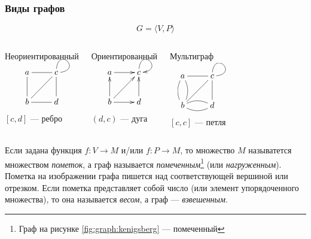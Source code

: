 \begin{frame}
    \frametitle{Виды графов}
    \[
        G=\langle V,P\rangle
    \]
    \begin{columns}
            \begin{block}{Неориентированный}
                \[
                    {\xymatrix{
                        a \ar@{-}[r] \ar@{-}[d]
                            &c \ar@{-}[d] \ar@{-}@(u,r)[]
                                \\
                        b \ar@{-}[ur] \ar@{-}[r]
                            &d
                    }}
                \]
                $[c,d]$ --- \alert{ребро}
            \end{block}
        
            \begin{block}{Ориентированный}
                \[
                    {\xymatrix{
                        a \ar@{->}[r]
                            &c \ar@{->}@(u,r)[]
                                \\
                        b  \ar@{->}[u] \ar@{->}[ur] \ar@{->}[r]
                            &d \ar@{->}[u]
                    }}
                \]
                $(d,c)$ --- \alert{дуга}
            \end{block}
            \begin{block}{Мультиграф}
            
                \[
                    {\xymatrix{
                        a \ar@{-}[r] \ar@{-}@/^/[d]
                            &c \ar@{-}[d] \ar@{-}@(u,r)[]
                                \\
                        b \ar@{-}[ur] \ar@{-}@/^/[r] \ar@{-}@/^/[u]
                            &d \ar@{-}@/^/[l]
                    }}
                \]
                $[c,c]$ --- \alert{петля}
            \end{block}
    \end{columns}
\end{frame}

Если задана функция $f:V\to M$ и/или $f:P\to M$, то множество $M$ называтется множеством \emph{пометок}, а граф называется \emph{помеченным}\footnote{Граф на рисунке \ref{fig:graph:kenigsberg} --- помеченный} (или \emph{нагруженным}). Пометка на изображении графа пишется над соответствующей вершиной или отрезком. Если пометка представляет собой число (или элемент упорядоченного множества), то она называется \emph{весом}, а граф --- \emph{взвешенным}.


